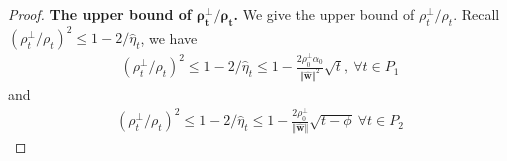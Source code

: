 \documentclass[10pt,a4paper]{amsart}
\begin{document}
\begin{proof}
  \noindent\textbf{The upper bound of $\boldsymbol{\rho_t^{\perp} / \rho_t}$.}
  We give the upper bound of $\rho_t^{\perp} / \rho_t$. 
  Recall $(\rho_{t}^{\perp}/\rho_{t})^2 \le 1 - 2/\hat{\eta}_t$, we have 
  \begin{equation*}
  \begin{aligned}
    (\rho_{t}^{\perp}/\rho_{t})^2 
    \le 1 - 2/\hat{\eta}_t 
    \le 
    1 - 
    \frac{ 2 \rho_{0}^{\perp} \alpha_0}{\Vert \hat{\mathbf{w}} \Vert^2}
    \sqrt{t}, \  \forall t \in P_1
  \end{aligned}
  \end{equation*}
  and
  \begin{equation*}
  \begin{aligned}
    (\rho_{t}^{\perp}/\rho_{t})^2 
    \le 1 - 2/\hat{\eta}_t 
    \le 
    1 - 
    \frac{ 2 \rho_{0}^{\perp}}{
      \Vert \hat{\mathbf{w}} \Vert
    }
    \sqrt{t - \phi}
    \ \forall t \in P_2
  \end{aligned}
  \end{equation*} 
\end{proof}
\end{document}
